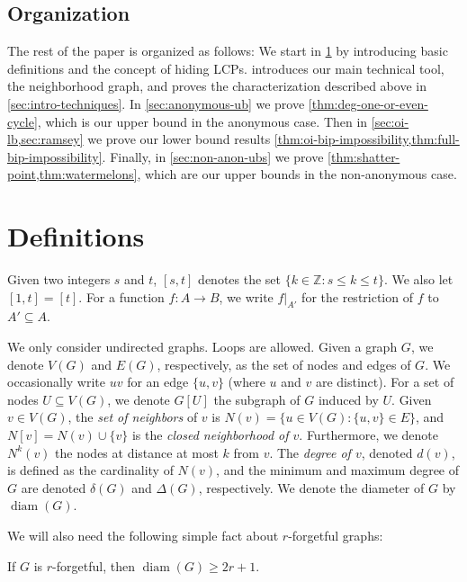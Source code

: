 \documentclass[11pt]{article}
\DeclareMathOperator{\diam}{diam}
\begin{document}
\subsection{Organization}

The rest of the paper is organized as follows:
We start in \cref{sec:defs} by introducing basic definitions and the concept of
hiding LCPs.
 introduces our main technical tool, the neighborhood graph, and
proves the characterization described above in \cref{sec:intro-techniques}.
In \cref{sec:anonymous-ub} we prove \cref{thm:deg-one-or-even-cycle}, which is
our upper bound in the anonymous case.
Then in \cref{sec:oi-lb,sec:ramsey} we prove our lower bound results
\cref{thm:oi-bip-impossibility,thm:full-bip-impossibility}.
Finally, in \cref{sec:non-anon-ubs} we prove
\cref{thm:shatter-point,thm:watermelons}, which are our upper bounds in the
non-anonymous case.

\section{Definitions}
\label{sec:defs}

Given two integers $s$ and $t$, $[s, t]$ denotes the set $\{k \in \mathbb{Z} : s
\leq k \leq t\}$. 
We also let $[1, t] = [t]$. 
For a function $f\colon A \to B$, we write $f|_{A'}$ for the restriction of $f$
to $A' \subseteq A$.

We only consider undirected graphs.
Loops are allowed.
Given a graph $G$, we denote $V(G)$ and $E(G)$, respectively, as the set of
nodes and edges of $G$. 
We occasionally write $uv$ for an edge $\{ u, v \}$ (where $u$ and $v$ are
distinct).
For a set of nodes $U\subseteq V(G)$, we denote $G[U]$ the subgraph of $G$
induced by $U$.
Given $v \in V(G)$, the \emph{set of neighbors} of $v$ is $N(v) = \big\{u \in
V(G) : \{u,v\} \in E\big\}$, and $N[v] = N(v) \cup \{v\}$ is the \emph{closed
neighborhood of $v$}. Furthermore, we denote $N^k(v)$ the nodes at distance at
most $k$ from $v$. The \emph{degree of $v$}, denoted $d(v)$, is defined as the
cardinality of $N(v)$, and the minimum and maximum degree of $G$ are denoted
$\delta(G)$ and $\Delta(G)$, respectively.
We denote the diameter of $G$ by $\diam(G)$.

We will also need the following simple fact about $r$-forgetful graphs:
\begin{lemma}
  \label{lem:forgetful-diam}
  If $G$ is $r$-forgetful, then $\diam(G) \ge 2r+1$.
\end{lemma}
\end{document}
